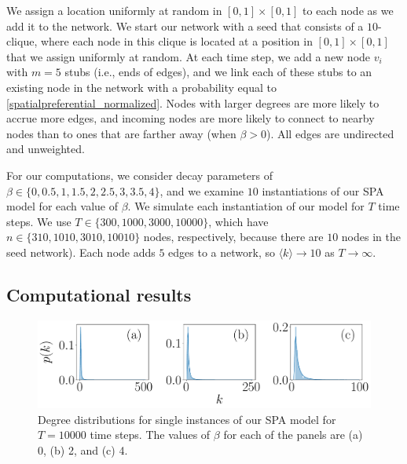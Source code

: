 \documentclass[%
 reprint,
 amsmath,amssymb,
 aps,
]{revtex4-1}
\begin{document}
We assign a location uniformly at random in $[0, 1] \times [0, 1]$ to each node as we add it to the network. 
We start our network with a seed that consists of a $10$-clique, where each node in this clique is located at a position in $[0, 1] \times [0, 1]$ that we assign uniformly at random. At each time step, we add a new node $v_i$ with $m=5$ stubs (i.e., ends of edges), and we link each of these stubs to an existing node in the network with a probability equal to \eqref{spatialpreferential_normalized}.
Nodes with larger degrees are more likely to accrue more edges, and incoming nodes are more likely to connect to nearby nodes than to ones that are farther away {\color{red}(when $\beta > 0$)}. All edges are undirected and unweighted. 

For our computations, we consider decay parameters of $\beta \in \{ 0, 0.5, 1, 1.5, 2, 2.5, 3, 3.5, 4\}$, and we examine $10$ instantiations of our SPA model for each value of $\beta$. We simulate each instantiation of our model for $T$ time steps. We use $T \in \{300, 1000, 3000, 10000\}$, which have $n \in \{310, 1010, 3010, 10010\}$ nodes, respectively, because there are $10$ nodes in the seed network). Each node adds $5$ edges to a network, so $\langle k \rangle \rightarrow 10$ as $T \rightarrow \infty$.


\subsection{Computational results}


\begin{figure}
    \centering
    \includegraphics[width=1.0\linewidth]{preferential_attachment_degree_distribution.pdf}
    \caption{Degree distributions for single instances of our SPA model for $T=10000$ time steps. The values of $\beta$ for each of the panels are (a) 0, (b) 2, and (c) 4.
    }
\end{figure}
\end{document}
